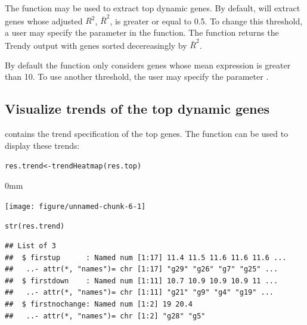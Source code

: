 \documentclass{article}\usepackage[]{graphicx}\usepackage[usenames,dvipsnames]{color}
\newcommand{\hlstd}[1]{\textcolor[rgb]{0.251,0.251,0.251}{#1}}%
\newcommand{\hlkwb}[1]{\textcolor[rgb]{0,0,0}{#1}}%
\newcommand{\hlkwd}[1]{\textcolor[rgb]{0.878,0.439,0.125}{#1}}%
\newenvironment{knitrout}{}{} %
\begin{document}
The  function may be used to extract top dynamic genes.
By default,  will extract genes whose adjusted $R^2$, $\bar{R}^{2}$,
is greater or equal to 0.5. To change this threshold, a user may specify the
 parameter in the  function. The  function returns
the Trendy output with genes sorted decereasingly by $\bar{R}^{2}$.


By default the  function only considers genes whose mean expression is greater than 10.
To use another threshold, the user may specify the parameter .


\subsection{Visualize trends of the top dynamic genes}

 contains the trend specification of the top genes. The function  can be used to display these trends:

\begin{knitrout}
\color{fgcolor}\begin{kframe}
\begin{alltt}
\hlstd{res.trend} \hlkwb{<-} \hlkwd{trendHeatmap}\hlstd{(res.top)}
\end{alltt}
\end{kframe}\begin{adjustwidth}{\fltoffset}{0mm}

{\centering \texttt{[image: figure/unnamed-chunk-6-1]} 

}

\end{adjustwidth}\begin{kframe}\begin{alltt}
\hlkwd{str}\hlstd{(res.trend)}
\end{alltt}
\begin{verbatim}
## List of 3
##  $ firstup      : Named num [1:17] 11.4 11.5 11.6 11.6 11.6 ...
##   ..- attr(*, "names")= chr [1:17] "g29" "g26" "g7" "g25" ...
##  $ firstdown    : Named num [1:11] 10.7 10.9 10.9 10.9 11 ...
##   ..- attr(*, "names")= chr [1:11] "g21" "g9" "g4" "g19" ...
##  $ firstnochange: Named num [1:2] 19 20.4
##   ..- attr(*, "names")= chr [1:2] "g28" "g5"
\end{verbatim}
\end{kframe}
\end{knitrout}
\end{document}
